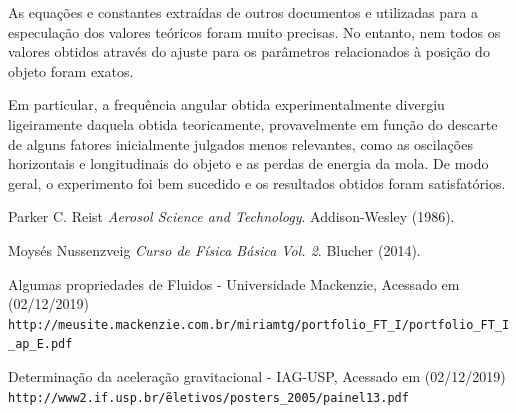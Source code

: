 \documentclass[12pt]{article}
\begin{document}
		As equações e constantes extraídas de outros documentos e utilizadas para a especulação dos valores teóricos foram muito precisas. No entanto, nem todos os valores obtidos através do ajuste para os parâmetros relacionados à posição do objeto foram exatos.
		
		Em particular, a frequência angular obtida experimentalmente divergiu ligeiramente daquela obtida teoricamente, provavelmente em função do descarte de alguns fatores inicialmente julgados menos relevantes, como as oscilações horizontais e longitudinais do objeto e as perdas de energia da mola. De modo geral, o experimento foi bem sucedido e os resultados obtidos foram satisfatórios.

	\newpage
	
	\begin{thebibliography}{99}
		 Parker C. Reist
		\emph{Aerosol Science and Technology}.
		Addison-Wesley (1986).
		
		 Moysés Nussenzveig
		\emph{Curso de Física Básica Vol. 2}.
		Blucher (2014).

		Algumas propriedades de Fluidos - Universidade Mackenzie, Acessado em (02/12/2019)
		\\\texttt{http://meusite.mackenzie.com.br/miriamtg/portfolio\_FT\_I/portfolio\_FT\_I\_ap\_E.pdf}
			
		Determinação da aceleração gravitacional - IAG-USP, Acessado em (02/12/2019)
		\\\texttt{http://www2.if.usp.br/\~eletivos/posters\_2005/painel13.pdf}
		
	\end{thebibliography}
\end{document}

